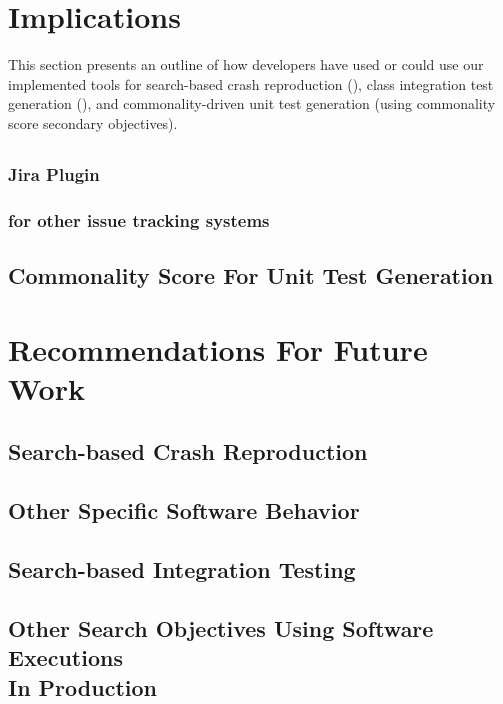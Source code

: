 \section{Implications}
This section presents an outline of how developers have used or could use our implemented tools for search-based crash reproduction (\botsing), class integration test generation (\cling), and commonality-driven unit test generation (using commonality score secondary objectives).

\subsection{\botsing}

\subsubsection{\botsing Jira Plugin}

\subsubsection{\botsing for other issue tracking systems}


\subsection{\cling}


\subsection{Commonality Score For Unit Test Generation}

\section{Recommendations For Future Work}

\subsection{Search-based Crash Reproduction}


\subsection{Other Specific Software Behavior}

\subsection{Search-based Integration Testing}


\subsection{Other Search Objectives Using Software Executions\\ In Production}